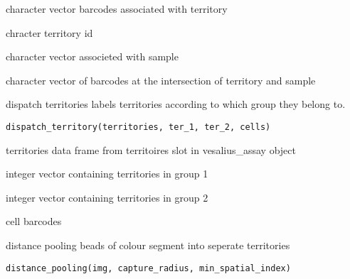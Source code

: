 \documentclass[a4paper]{book}
\begin{document}
%
\begin{Arguments}
\begin{ldescription}
\item[\code{territory\_barcodes}] character vector barcodes associated with territory

\item[\code{ter}] chracter territory id

\item[\code{sample}] character vector associeted with sample
\end{ldescription}
\end{Arguments}
%
\begin{Value}
character vector of barcodes at the intersection of territory and sample
\end{Value}
%
\begin{Description}
dispatch territories labels territories according to which
group they belong to.
\end{Description}
%
\begin{Usage}
\begin{verbatim}
dispatch_territory(territories, ter_1, ter_2, cells)
\end{verbatim}
\end{Usage}
%
\begin{Arguments}
\begin{ldescription}
\item[\code{territories}] territories data frame from territoires slot in 
vesalius\_assay object

\item[\code{ter\_1}] integer vector containing territories in group 1

\item[\code{ter\_2}] integer vector containing territories in group 2

\item[\code{cells}] cell barcodes
\end{ldescription}
\end{Arguments}
%
\begin{Description}
distance pooling beads of colour segment into seperate territories
\end{Description}
%
\begin{Usage}
\begin{verbatim}
distance_pooling(img, capture_radius, min_spatial_index)
\end{verbatim}
\end{Usage}
\end{document}
